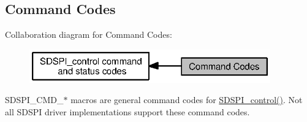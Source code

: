 \subsection{Command Codes}
\label{group___s_d_s_p_i___c_m_d}
Collaboration diagram for Command Codes\+:
\nopagebreak
\begin{figure}[H]
\begin{center}
\leavevmode
\includegraphics[width=295pt]{group___s_d_s_p_i___c_m_d}
\end{center}
\end{figure}
S\+D\+S\+P\+I\+\_\+\+C\+M\+D\+\_\+$\ast$ macros are general command codes for \hyperlink{_s_d_s_p_i_8h_a541a1db109382fe090ed7a9209a34f61}{S\+D\+S\+P\+I\+\_\+control()}. Not all S\+D\+S\+P\+I driver implementations support these command codes. 